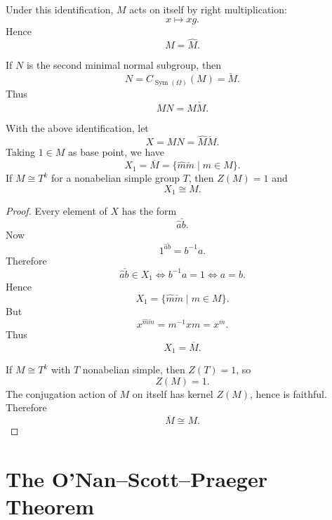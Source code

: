 Under this identification, \(M\) acts on itself by right multiplication:
\[
    x\mapsto xg.
\]
Hence
\[
    M=\widehat M.
\]

If \(N\) is the second minimal normal subgroup, then
\[
    N=C_{\operatorname{Sym}(\Omega)}(M)=\check M.
\]
Thus
\[
    MN=\widehat M\check M.
\]

\begin{proposition}
With the above identification, let
\[
    X=MN=\widehat M\check M.
\]
Taking \(1\in M\) as base point, we have
\[
    X_1=\overline M
    =
    \{\widehat m\check m\mid m\in M\}.
\]
If \(M\cong T^k\) for a nonabelian simple group \(T\), then \(Z(M)=1\) and
\[
    X_1\cong M.
\]
\end{proposition}

\begin{proof}
Every element of \(X\) has the form
\[
    \widehat a\check b.
\]
Now
\[
    1^{\widehat a\check b}=b^{-1}a.
\]
Therefore
\[
    \widehat a\check b\in X_1
    \Longleftrightarrow
    b^{-1}a=1
    \Longleftrightarrow
    a=b.
\]
Hence
\[
    X_1=\{\widehat m\check m\mid m\in M\}.
\]
But
\[
    x^{\widehat m\check m}
    =
    m^{-1}xm
    =
    x^{\overline m}.
\]
Thus
\[
    X_1=\overline M.
\]

If \(M\cong T^k\) with \(T\) nonabelian simple, then \(Z(T)=1\), so
\[
    Z(M)=1.
\]
The conjugation action of \(M\) on itself has kernel \(Z(M)\), hence is faithful. Therefore
\[
    \overline M\cong M.
\]
\end{proof}

\section{The O'Nan--Scott--Praeger Theorem}

